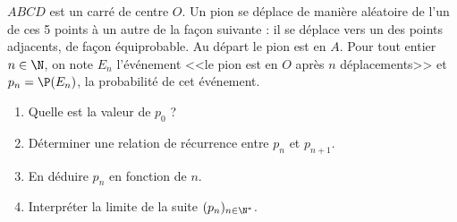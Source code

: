 \documentclass[a4paper,10pt]{report}
\begin{document}
\everymath{\displaystyle}

\begin{center}
\end{center}

\begin{Exercice}{} $ABCD$ est un carré de centre $O$. Un pion se déplace de manière aléatoire de l'un de ces 5 points à un autre de la façon suivante : il se déplace vers un des points adjacents, de façon équiprobable. Au départ le pion est en $A$. Pour tout entier $n \in \N$, on note $E_n$ l'événement <<le pion est en $O$ après $n$ déplacements>> et $p_n = \P(E_n)$, la probabilité de cet événement.
\begin{center}\end{center}
\begin{enumerate}
 \item Quelle est la valeur de $p_0$ ?
 \item Déterminer une relation de récurrence entre $p_n$ et $p_{n+1}$.
 \item En déduire $p_n$ en fonction de $n$.
 \item Interpréter la limite de la suite $(p_n)_{n\in \N^*}$.
\end{enumerate}
\end{Exercice}
\end{document}
